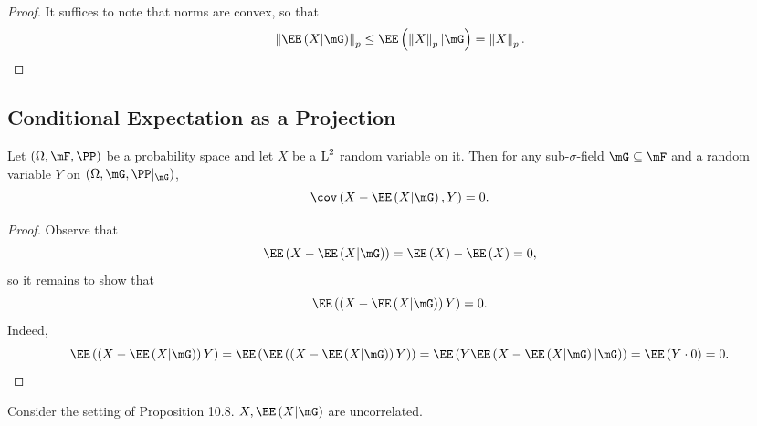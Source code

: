 \documentclass[stat901]{subfiles}
\begin{document}
    \begin{proof}
        It suffices to note that norms are convex, so that
        \begin{equation*}
            \left\lVert \EE\left( X|\mG \right)\right\rVert_p \leq  \EE\left( \left\lVert X\right\rVert_p|\mG \right) = \left\lVert X\right\rVert_p.
        \end{equation*}
    \end{proof}
    
    \subsection{Conditional Expectation as a Projection}
    
    \begin{prop}{}
        Let $\left( \Omega,\mF,\PP \right)$ be a probability space and let $X$ be a $\operatorname{L}^2$ random variable on it. Then for any sub-$\sigma$-field $\mG\subseteq\mF$ and a random variable $Y$ on $\left( \Omega,\mG,\PP|_{\mG} \right)$,
        \begin{equation*}
            \cov\left( X-\EE\left( X|\mG \right), Y \right) = 0.
        \end{equation*}
    \end{prop}

    \begin{proof}
        Observe that
        \begin{equation*}
            \EE\left( X-\EE\left( X|\mG \right) \right) = \EE\left( X \right)-\EE\left( X \right) = 0,
        \end{equation*}
        so it remains to show that
        \begin{equation*}
            \EE\left( \left( X-\EE\left( X|\mG \right) \right)Y \right) = 0.
        \end{equation*}
        Indeed,
        \begin{equation*}
            \EE\left( \left( X-\EE\left( X|\mG \right) \right)Y \right) = \EE\left( \EE\left( \left( X-\EE\left( X|\mG \right) \right)Y \right) \right) = \EE\left( Y\EE\left( X-\EE\left( X|\mG \right)|\mG \right) \right) = \EE\left( Y \cdot 0 \right) = 0.
        \end{equation*}
    \end{proof}

    \begin{cor}{}
        Consider the setting of Proposition 10.8. $X,\EE\left( X|\mG \right)$ are uncorrelated.
    \end{cor}	
\end{document}
